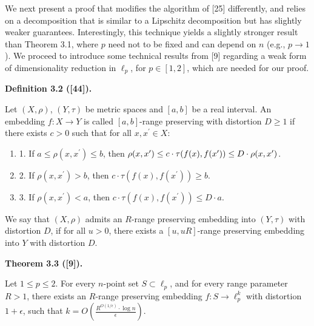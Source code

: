 \par
\par
We next present a proof that modifies the algorithm of [25] differently, and relies on a decomposition that is similar to a Lipschitz decomposition but has slightly weaker guarantees. Interestingly, this technique yields a slightly stronger result than Theorem 3.1, where $p$ need not to be fixed and can depend on $n$ (e.g., $p\to 1$). We proceed to introduce some technical results from [9] regarding a weak form of dimensionality reduction in $\ell_{p}$, for $p\in[1,2]$, which are needed for our proof.
\par
\par
\par\medskip\noindent\textbf{Definition 3.2 ([44]).}\par
Let $(X,\rho)$, $(Y,\tau)$ be metric spaces and $[a,b]$ be a real interval. An embedding $f:X\rightarrow Y$ is called $[a,b]$-range preserving with distortion $D\geq 1$  if there exists $c>0$ such that for all $x,x^{\prime}\in X$:
\par
\begin{enumerate}
\item[]  1. 
If $a\leq\rho(x,x^{\prime})\leq b$, then $\rho(x,x^{\prime})\leq c\cdot\tau(f(x),f(x^{\prime}))\leq D\cdot\rho(x,x^{%
\prime})$.
\par
\par
\item[]  2. 
If $\rho(x,x^{\prime})>b$, then $c\cdot\tau(f(x),f(x^{\prime}))\geq b$.
\par
\par
\item[]  3. 
If $\rho(x,x^{\prime})<a$, then $c\cdot\tau(f(x),f(x^{\prime}))\leq D\cdot a$.
\par
\par
\end{enumerate}
\par
\par
We say that $(X,\rho)$ admits an $R$-range preserving embedding into $(Y,\tau)$ with distortion $D$, if for all $u>0$, there exists a $[u,uR]$-range preserving embedding into $Y$ with distortion $D$.
\par
\par
\par\medskip\noindent\textbf{Theorem 3.3 ([9]).}\par
Let $1\leq p\leq 2$. For every $n$-point set $S\subset\ell_{p}$, and for every range parameter $R>1$, there exists an $R$-range preserving embedding $f:S\rightarrow\ell_{p}^{k}$ with distortion $1+\epsilon$, such that $k=O\left(\frac{R^{O(1/\epsilon)}\cdot\log n}{\epsilon}\right)$.
